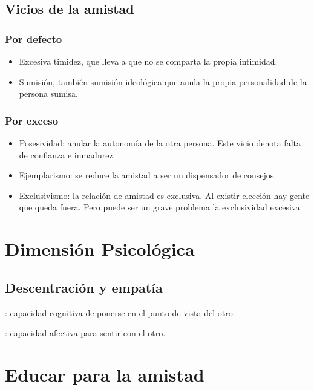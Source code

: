 \documentclass[palatino]{apuntesURJC}
\begin{document}
\subsection{Vicios de la amistad}

\subsubsection{Por defecto}

\begin{itemize}
	\item Excesiva timidez, que lleva a que no se comparta la propia intimidad.
	\item Sumisión, también sumisión ideológica que anula la propia personalidad de la persona sumisa.
\end{itemize}

\subsubsection{Por exceso}

\begin{itemize}
	\item Posesividad: anular la autonomía de la otra persona.
	\subitem Este vicio denota falta de confianza e inmadurez.
	\item Ejemplarismo: se reduce la amistad a ser un dispensador de consejos.
	\item Exclusivismo: la relación de amistad es exclusiva. Al existir elección hay gente que queda fuera. 
	Pero puede ser un grave problema la exclusividad excesiva.
\end{itemize}


\section{Dimensión Psicológica}

\subsection{Descentración y empatía}

: capacidad cognitiva de ponerse en el punto de vista del otro.

: capacidad afectiva para sentir con el otro.


\section{Educar para la amistad}
\end{document}
